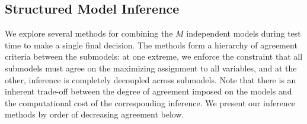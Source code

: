 
\subsection{Structured Model Inference}
We explore several methods for combining the $M$ independent models
during test time to make a single final decision.  The methods form a
hierarchy of agreement criteria between the submodels: at one extreme,
we enforce the constraint that all submodels must agree on the
maximizing assignment to all variables, and at the other, inference is
completely decoupled across submodels. Note that there is an inherent
trade-off between the degree of agreement imposed on the models and the
computational cost of the corresponding inference.  We present our
inference methods by order of decreasing agreement below.

